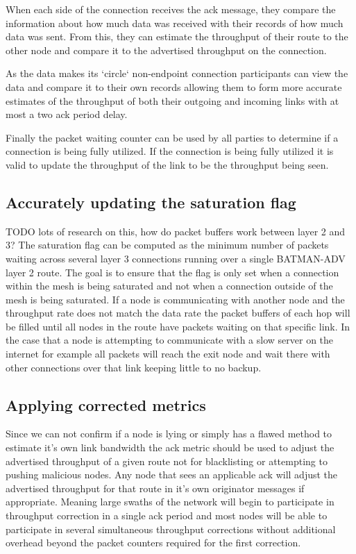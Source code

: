 \documentclass[11pt]{article}
\begin{document}
				When each side of the connection receives the ack message, they compare the information about how much data was received with their records of how much data was sent. From this, they can estimate the throughput of their route to the other node and compare it to the advertised throughput on the connection. 

				As the data makes its `circle` non-endpoint connection participants can view the data and compare it to their own records allowing them to form more accurate estimates of the throughput of both their outgoing and incoming links with at most a two ack period delay. 
				
				Finally the packet waiting counter can be used by all parties to determine if a connection is being fully utilized. If the connection is being fully utilized it is valid to update the throughput of the link to be the throughput being seen.
				
				
	\subsection{Accurately updating the saturation flag}
	
				TODO lots of research on this, how do packet buffers work between layer 2 and 3?
				The saturation flag can be computed as the minimum number of packets waiting across several layer 3 connections running over a single BATMAN-ADV layer 2 route. The goal is to ensure that the flag is only set when a connection within the mesh is being saturated and not when a connection outside of the mesh is being saturated. If a node is communicating with another node and the throughput rate does not match the data rate the packet buffers of each hop will be filled until all nodes in the route have packets waiting on that specific link. In the case that a node is attempting to communicate with a slow server on the internet for example all packets will reach the exit node and wait there with other connections over that link keeping little to no backup. 
				
	\subsection{Applying corrected metrics}
				
				Since we can not confirm if a node is lying or simply has a flawed method to estimate it's own link bandwidth the ack metric should be used to adjust the advertised throughput of a given route not for blacklisting or attempting to pushing malicious nodes. Any node that sees an applicable ack will adjust the advertised throughput for that route in it's own originator messages if appropriate. Meaning large swaths of the network will begin to participate in throughput correction in a single ack period and most nodes will be able to participate in several simultaneous throughput corrections without additional overhead beyond the packet counters required for the first correction.
				
\end{document}
